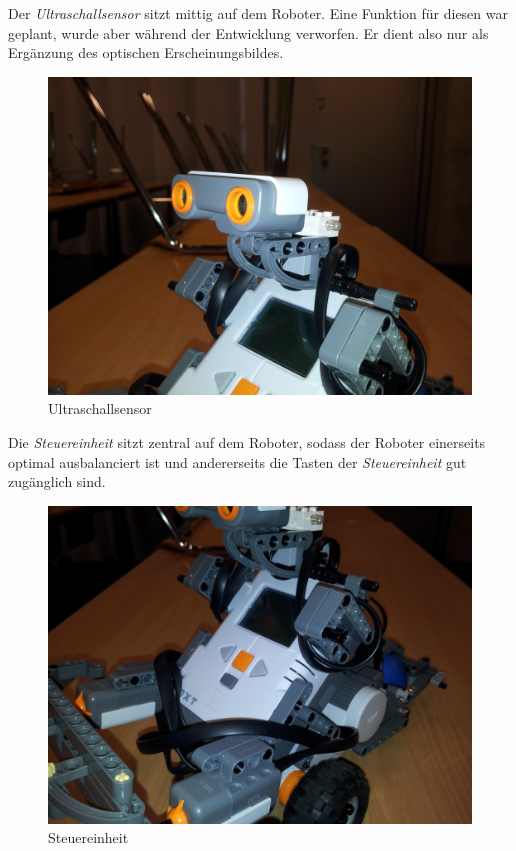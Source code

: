 \documentclass[a4paper]{article}
\begin{document}
\newpage

Der \emph{Ultraschallsensor} sitzt mittig auf dem Roboter. Eine
Funktion für diesen war geplant, wurde aber während der Entwicklung
verworfen. Er dient also nur als Ergänzung des optischen Erscheinungsbildes.

\begin{figure}[h]
  \centering
  \caption{Ultraschallsensor}
  \includegraphics[scale=0.06]{roboter_ultraschallsensor.jpg}
\end{figure}

Die \emph{Steuereinheit} sitzt zentral auf dem Roboter, sodass der
Roboter einerseits optimal ausbalanciert ist und andererseits die
Tasten der \emph{Steuereinheit} gut zugänglich sind.

\begin{figure}[h]
  \centering
  \caption{Steuereinheit}
  \includegraphics[scale=0.06]{roboter_steuereinheit.jpg}
\end{figure}
\end{document}
